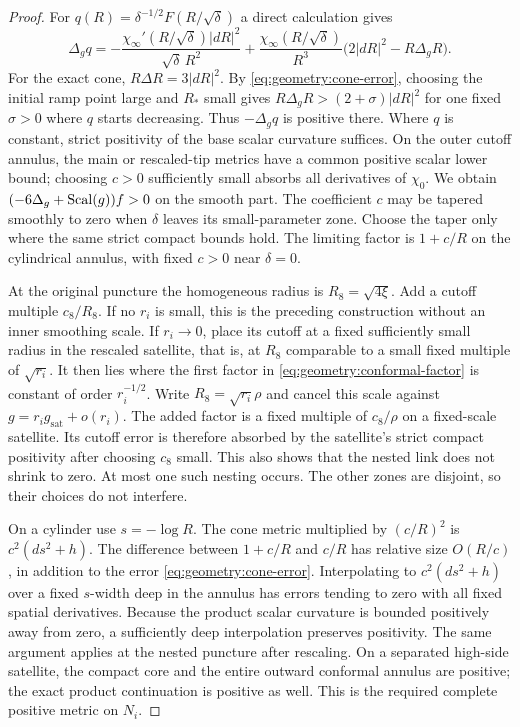 \begin{proof}
For $q(R)=\delta^{-1/2}F(R/\sqrt\delta)$ a direct calculation gives
\begin{equation}
 \Delta_g q
 =-\frac{\chi_\infty'(R/\sqrt\delta)|dR|^2}
          {\sqrt\delta\,R^2}
   +\frac{\chi_\infty(R/\sqrt\delta)}{R^3}
       \bigl(2|dR|^2-R\Delta_gR\bigr).
 \label{eq:geometry:radial-laplacian}
\end{equation}
For the exact cone, $R\Delta R=3|dR|^2$.  By
\eqref{eq:geometry:cone-error}, choosing the initial ramp point
large and $R_*$ small gives
$R\Delta_gR>(2+\sigma)|dR|^2$ for one fixed $\sigma>0$
where $q$ starts decreasing.  Thus $-\Delta_gq$ is positive
there.  Where $q$ is constant, strict positivity of the base
scalar curvature suffices.  On the outer cutoff annulus, the
main or rescaled-tip metrics have a common positive scalar
lower bound; choosing $c>0$ sufficiently small absorbs all
derivatives of $\chi_0$.  We obtain
$(-6\Delta_g+\operatorname{Scal}(g))f>0$ on the smooth part.  The coefficient
$c$ may be tapered smoothly to zero when $\delta$ leaves its
small-parameter zone.  Choose the taper only where the same
strict compact bounds hold.  The limiting factor is $1+c/R$
on the cylindrical annulus, with fixed $c>0$ near $\delta=0$.

At the original puncture the homogeneous radius is
$R_8=\sqrt{4\xi}$.  Add a cutoff multiple $c_8/R_8$.  If no
$r_i$ is small, this is the preceding construction without an
inner smoothing scale.  If $r_i\to0$, place its cutoff at a
fixed sufficiently small radius in the rescaled satellite,
that is, at $R_8$ comparable to a small fixed multiple of
$\sqrt{r_i}$.  It then lies where the first factor in
\eqref{eq:geometry:conformal-factor} is constant of order
$r_i^{-1/2}$.  Write $R_8=\sqrt{r_i}\rho$ and cancel this scale
against $g=r_i g_{\mathrm{sat}}+o(r_i)$.  The added factor is
a fixed multiple of $c_8/\rho$ on a fixed-scale satellite.
Its cutoff error is therefore absorbed by the satellite's
strict compact positivity after choosing $c_8$ small.  This
also shows that the nested link does not shrink to zero.
At most one such nesting occurs.  The other zones are
disjoint, so their choices do not interfere.

On a cylinder use $s=-\log R$.  The cone metric multiplied by
$(c/R)^2$ is $c^2(ds^2+h)$.  The difference between $1+c/R$
and $c/R$ has relative size $O(R/c)$, in addition to the error
\eqref{eq:geometry:cone-error}.  Interpolating to
$c^2(ds^2+h)$ over a fixed $s$-width deep in the annulus has
errors tending to zero with all fixed spatial derivatives.
Because the product scalar curvature is bounded positively
away from zero, a sufficiently deep interpolation preserves
positivity.  The same argument applies at the nested puncture
after rescaling.  On a separated high-side satellite, the
compact core and the entire outward conformal annulus are
positive; the exact product continuation is positive as well.
This is the required complete positive metric on $N_i$.
\end{proof}

